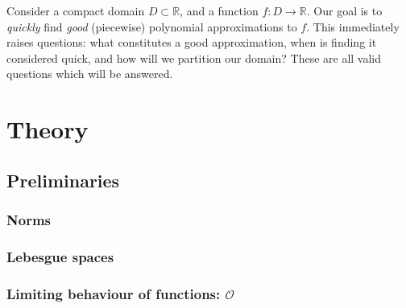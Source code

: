 \documentclass[11pt]{report}
\theoremstyle{definition}
\theoremstyle{remark}
\newcommand{\R}{\mathbb{R}}
\begin{document}
\title{}
\author{Jan Westerdiep}
\maketitle

Consider a compact domain $D \subset \R$, and a function $f: D \to \R$. Our goal is to \emph{quickly} find \emph{good} (piecewise) polynomial approximations to $f$. This immediately raises questions: what constitutes a good approximation, when is finding it considered quick, and how will we partition our domain? These are all valid questions which will be answered.

\part{Theory}
\setcounter{chapter}{-1}
\chapter{Preliminaries}

\section{Norms}
\label{sec:norms}
\section{Lebesgue spaces}
\label{sec:leb}

\section{Limiting behaviour of functions: $\mathcal{O}$}
\end{document}
